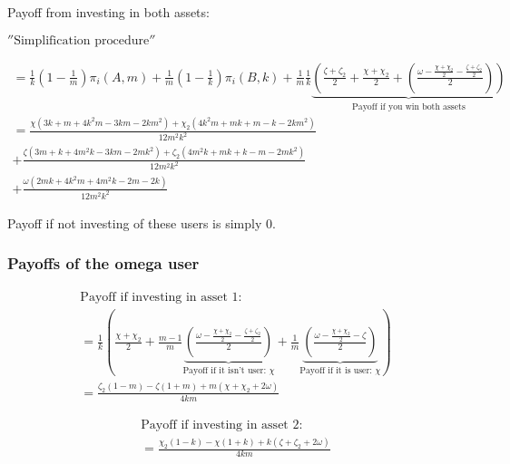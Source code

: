 \documentclass{article}
\begin{document}
Payoff from investing in both assets: 

$\hyperref[ROB2]{''\text{Simplification procedure}''}$

\begin{align*}
=
\frac{1}{k}
\left 
(1- \frac{1}{m} 
\right )
\pi_i(A,m)
+
\frac{1}{m}\left (1- \frac{1}{k} \right )
\pi_i(B,k)
+
\frac{1}{m}\frac{1}{k} 
\underbrace{
\left(
\frac{\zeta+\zeta_{2}}{2}
+
\frac{\chi+\chi_{2}}{2}
+
\left(
\frac{\omega-\frac{\chi+\chi_{2}}{2}-\frac{\zeta+\zeta_{2}}{2}}{2}
\right)
\right) }_{\text{Payoff if you win both assets}}
\\ 
= 
\frac{\chi(3k+m+4k^2m-3km-2km^2)+\chi_2(4k^2m+mk+m-k-2km^2)}{12m^2k^2} \\
+\frac{\zeta(3m+k+4m^2k-3km-2mk^2)+\zeta_2(4m^2k+mk+k-m-2mk^2)}{12m^2k^2} \\
+\frac{\omega(2mk+4k^2m+4m^2k-2m-2k)}{12m^2k^2}
\end{align*} 

Payoff if not investing of these users is simply 0. 

\subsubsection{Payoffs of the omega user}


\begin{align*}
\text{Payoff if investing in asset 1:} \\
=\frac{1}{k}
\left( 
\frac{\chi+\chi_2}{2} 
+ \frac{m-1}{m} 
\underbrace{
\left(
\frac{\omega - \frac{\chi+\chi_2}{2}-\frac{\zeta+\zeta_2}{2}}{2} 
\right)
}_{\text{Payoff if it isn't user: } \chi}
+
\frac{1}{m} 
\underbrace{
\left(
\frac{\omega - \frac{\chi+\chi_2}{2}-\zeta}{2} 
\right)
}_{\text{Payoff if it is user: } \chi}
\right) \\
=\frac{\zeta_2(1-m)-\zeta(1+m)+m(\chi+\chi_2+2\omega)}{4km}
\end{align*}


\begin{align*}
\text{Payoff if investing in asset 2:} \\
=\frac{\chi_2(1-k)-\chi(1+k)+k(\zeta+\zeta_2+2\omega)}{4km}
\end{align*}
\end{document}
